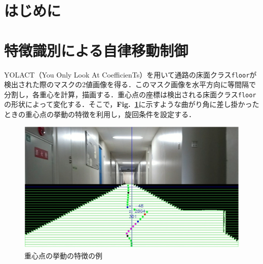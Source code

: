 \documentclass[luatex,fleqn,twocolumn,twoside]{ltjarticle}
\begin{document}
\section{\large はじめに}

\section{\large 特徴識別による自律移動制御}

YOLACT（You Only Look At CoefficienTs）を用いて通路の床面クラス\texttt{floor}が検出された際のマスクの2値画像を得る．このマスク画像を水平方向に等間隔で分割し，各重心を計算，描画する．重心点の座標は検出される床面クラス\texttt{floor}の形状によって変化する．そこで，{\bf Fig.~\ref{fig:example}}に示すような曲がり角に差し掛かったときの重心点の挙動の特徴を利用し，旋回条件を設定する．
\begin{figure}[htbp]
	\begin{center}
	\includegraphics[scale=0.4]{./fig/case1-2.png}
	\caption{重心点の挙動の特徴の例}
	\label{fig:example}
	\end{center}
\end{figure}
\end{document}
